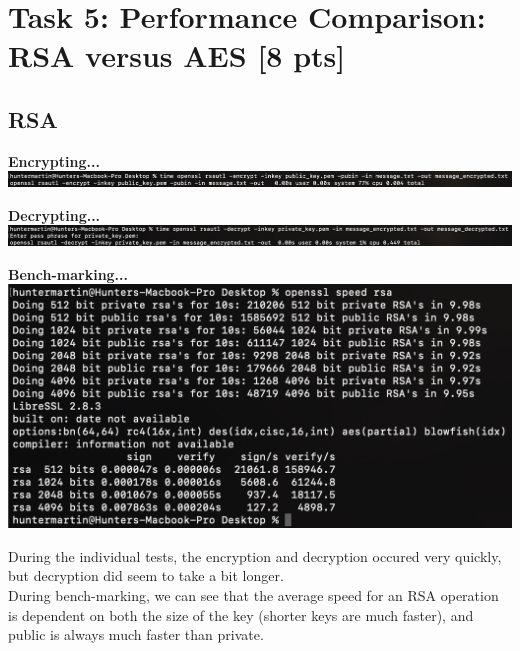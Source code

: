 \documentclass{article}
\begin{document}
\section{Task 5: Performance Comparison: RSA versus AES [8 pts]}

\subsection{RSA}
\begin{center}
    \textbf{Encrypting...}\\
    \includegraphics[scale=0.4]{rsa_in.png}
    
    \textbf{Decrypting...}\\
    \includegraphics[scale=0.4]{rsa_out.png}
    
    \textbf{Bench-marking...}\\
    \includegraphics[scale=0.5]{rsa_benchmark.png}
\end{center}
During the individual tests, the encryption and decryption occured very quickly, but decryption did seem to take a bit longer.\\

During bench-marking, we can see that the average speed for an RSA operation is dependent on both the size of the key (shorter keys are much faster), and public is always much faster than private.
\end{document}
